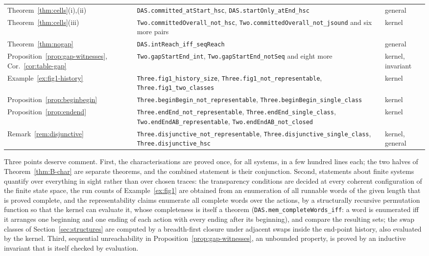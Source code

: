 \documentclass[preprint,12pt]{elsarticle}
\theoremstyle{plain}
\theoremstyle{definition}
\newcommand{\lean}[1]{\texttt{#1}}
\begin{document}
\begin{table}[t]
{\begin{tabular}{@{}lll@{}}
Theorem~\ref{thm:cells}(i),(ii) & \lean{DAS.committed\_atStart\_hsc}, \lean{DAS.startOnly\_atEnd\_hsc} & general \\
Theorem~\ref{thm:cells}(iii) & \lean{Two.committedOverall\_not\_hsc}, \lean{Two.committedOverall\_not\_jsound} and six more pairs & kernel \\
Theorem~\ref{thm:nogap} & \lean{DAS.intReach\_iff\_seqReach} & general \\
Proposition~\ref{prop:gap-witnesses}, Cor.~\ref{cor:table-gap} & \lean{Two.gapStartEnd\_int}, \lean{Two.gapStartEnd\_notSeq} and eight more & kernel, invariant \\
Example~\ref{ex:fig1-history} & \lean{Three.fig1\_history\_size}, \lean{Three.fig1\_not\_representable}, \lean{Three.fig1\_two\_classes} & kernel \\
Proposition~\ref{prop:beginbegin} & \lean{Three.beginBegin\_not\_representable}, \lean{Three.beginBegin\_single\_class} & kernel \\
Proposition~\ref{prop:endend} & \lean{Three.endEnd\_not\_representable}, \lean{Three.endEnd\_single\_class}, \lean{Two.endEndAB\_representable}, \lean{Two.endEndAB\_not\_closed} & kernel \\
Remark~\ref{rem:disjunctive} & \lean{Three.disjunctive\_not\_representable}, \lean{Three.disjunctive\_single\_class}, \lean{Three.disjunctive\_hsc} & kernel, general \\
\bottomrule
\end{tabular}}
\end{table}

Three points deserve comment. First, the characterisations are proved once, for all systems, in a few hundred lines each; the two halves of Theorem~\ref{thm:B-char} are separate theorems, and the combined statement is their conjunction. Second, statements about finite systems quantify over everything in sight rather than over chosen traces: the transparency conditions are decided at every coherent configuration of the finite state space, the run counts of Example~\ref{ex:fig1} are obtained from an enumeration of all runnable words of the given length that is proved complete, and the representability claims enumerate all complete words over the actions, by a structurally recursive permutation function so that the kernel can evaluate it, whose completeness is itself a theorem (\lean{DAS.mem\_completeWords\_iff}: a word is enumerated iff it arranges one beginning and one ending of each action with every ending after its beginning), and compare the resulting sets; the swap classes of Section~\ref{sec:structures} are computed by a breadth-first closure under adjacent swaps inside the end-point history, also evaluated by the kernel. Third, sequential unreachability in Proposition~\ref{prop:gap-witnesses}, an unbounded property, is proved by an inductive invariant that is itself checked by evaluation.
\end{document}
